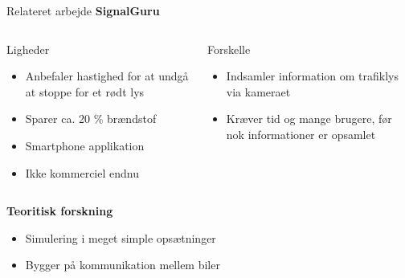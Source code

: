 \begin{frame}{Relateret arbejde}
\textbf{SignalGuru}
\vspace{2mm}
\begin{columns}
	\begin{column}{0.45\textwidth}
		Ligheder
		\begin{itemize}
			\item Anbefaler hastighed for at undgå at stoppe for et rødt lys
			\item Sparer ca. 20 \% brændstof
			\item Smartphone applikation
			\item Ikke kommerciel endnu
		\end{itemize}
	\end{column}

	\begin{column}{0.45\textwidth}
		Forskelle
		\begin{itemize}
			\item Indsamler information om trafiklys via kameraet
			\item Kræver tid og mange brugere, før nok informationer er opsamlet
		\end{itemize}
		\vspace{5mm}
	\end{column}
\end{columns}
\vspace{5mm}

\textbf{Teoritisk forskning}
\vspace{1mm}
\begin{itemize}
	\item Simulering i meget simple opsætninger
	\item Bygger på kommunikation mellem biler
\end{itemize}
\end{frame}


